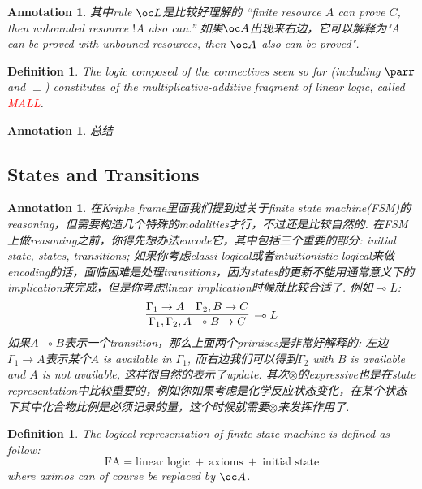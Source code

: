 \documentclass{article}
\theoremstyle{plain}
\newtheorem{definition}[theorem]{Definition}
\newtheorem{annotation}[theorem]{Annotation}
\theoremstyle{nonumberplain}
\newcommand{\redt}[1]{\textcolor{red}{#1}}
\begin{document}
\begin{annotation}
\rm 其中rule $\oc L$是比较好理解的 “finite resource $A$ can prove $C$, then unbounded resource $!A$ also can.” 如果$\oc A$出现来右边，它可以解释为"$A$ can be proved with unbouned resources, then $\oc A$ also can be proved".  
\end{annotation}

\begin{definition}
\rm The logic composed of the connectives seen so far (including $\parr$ and $\perp$) constitutes of the multiplicative-additive fragment of linear logic, called \redt{MALL}. 
\end{definition}


\begin{annotation}
\rm 总结
\end{annotation}

\newpage
\subsection{States and Transitions}

\begin{annotation}
\rm 在Kripke frame里面我们提到过关于finite state machine(FSM)的reasoning，但需要构造几个特殊的modalities才行，不过还是比较自然的. 在FSM上做reasoning之前，你得先想办法encode它，其中包括三个重要的部分: initial state, states, transitions; 如果你考虑classi logical或者intuitionistic logical来做encoding的话，面临困难是处理transitions，因为states的更新不能用通常意义下的implication来完成，但是你考虑linear implication时候就比较合适了. 例如$\multimap L$:
\[
	\infer[\multimap L]{\Gamma_1, \Gamma_2, A \multimap B \to C}{\Gamma_1 \to A & \Gamma_2, B\to C}
\]
如果$A \multimap B$表示一个transition，那么上面两个primises是非常好解释的: 左边$\Gamma_1 \to A$表示某个$A$ is available in $\Gamma_1$, 而右边我们可以得到$\Gamma_2$ with $B$ is available and $A$ is not available, 这样很自然的表示了update. 其次$\otimes$的expressive也是在state representation中比较重要的，例如你如果考虑是化学反应状态变化，在某个状态下其中化合物比例是必须记录的量，这个时候就需要$\otimes$来发挥作用了.
\end{annotation}


\begin{definition}
\rm The logical representation of finite state machine is defined as follow:
\[
	\text{FA} = \text{linear logic} ~ + ~ \text{axioms} ~ + ~  \text{initial state}
\]
where aximos can of course be replaced by $\oc A$.
\end{definition}
\end{document}
